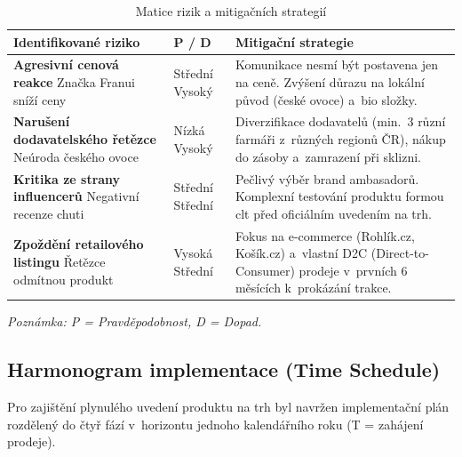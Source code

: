 \begin{table}[H]
\centering
\caption{Matice rizik a mitigačních strategií}
\label{tab:risk_matrix}
\begin{tabularx}{\textwidth}{p{4.5cm} p{2cm} X}
\toprule
\textbf{Identifikované riziko} & \textbf{P / D} & \textbf{Mitigační strategie} \\
\midrule
\textbf{Agresivní cenová reakce} \newline Značka Franui sníží ceny & Střední \newline Vysoký & Komunikace nesmí být postavena jen na ceně. Zvýšení důrazu na lokální původ (české ovoce) a~\gls{bio} složky. \\
\midrule
\textbf{Narušení dodavatelského řetězce} \newline Neúroda českého ovoce & Nízká \newline Vysoký & Diverzifikace dodavatelů (min.\ 3 různí farmáři z~různých regionů ČR), nákup do zásoby a~zamrazení při sklizni. \\
\midrule
\textbf{Kritika ze strany influencerů} \newline Negativní recenze chuti & Střední \newline Střední & Pečlivý výběr brand ambasadorů. Komplexní testování produktu formou \gls{clt} před oficiálním uvedením na trh. \\
\midrule
\textbf{Zpoždění retailového listingu} \newline Řetězce odmítnou produkt & Vysoká \newline Střední & Fokus na e-commerce (Rohlík.cz, Košík.cz) a~vlastní D2C (Direct-to-Consumer) prodeje v~prvních 6 měsících k~prokázání trakce. \\
\bottomrule
\end{tabularx}
\begin{tablenotes}\small
\item \textit{Poznámka: P = Pravděpodobnost, D = Dopad.}
\end{tablenotes}
\end{table}

\subsection{Harmonogram implementace (Time Schedule)}
\label{subsec:res_timeline}

Pro zajištění plynulého uvedení produktu na trh byl navržen implementační plán rozdělený do čtyř fází v~horizontu jednoho kalendářního roku (T = zahájení prodeje).

